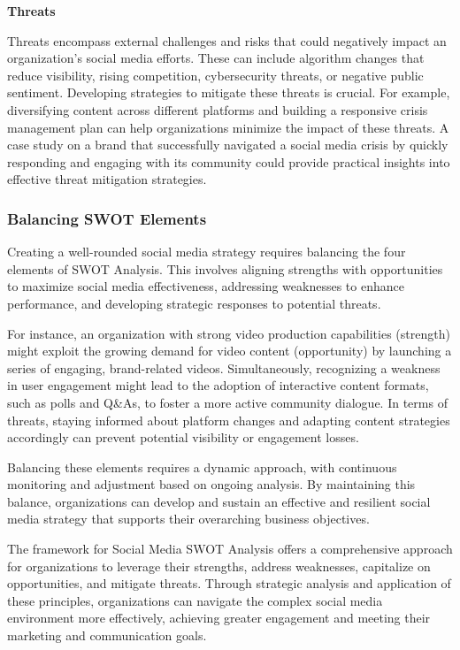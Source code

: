 \documentclass[
]{book}
\begin{document}
\textbf{Threats}

Threats encompass external challenges and risks that could negatively impact an organization's social media efforts. These can include algorithm changes that reduce visibility, rising competition, cybersecurity threats, or negative public sentiment. Developing strategies to mitigate these threats is crucial. For example, diversifying content across different platforms and building a responsive crisis management plan can help organizations minimize the impact of these threats. A case study on a brand that successfully navigated a social media crisis by quickly responding and engaging with its community could provide practical insights into effective threat mitigation strategies.

\hypertarget{balancing-swot-elements}{%
\subsubsection*{Balancing SWOT Elements}\label{balancing-swot-elements}}

Creating a well-rounded social media strategy requires balancing the four elements of SWOT Analysis. This involves aligning strengths with opportunities to maximize social media effectiveness, addressing weaknesses to enhance performance, and developing strategic responses to potential threats.

For instance, an organization with strong video production capabilities (strength) might exploit the growing demand for video content (opportunity) by launching a series of engaging, brand-related videos. Simultaneously, recognizing a weakness in user engagement might lead to the adoption of interactive content formats, such as polls and Q\&As, to foster a more active community dialogue. In terms of threats, staying informed about platform changes and adapting content strategies accordingly can prevent potential visibility or engagement losses.

Balancing these elements requires a dynamic approach, with continuous monitoring and adjustment based on ongoing analysis. By maintaining this balance, organizations can develop and sustain an effective and resilient social media strategy that supports their overarching business objectives.

The framework for Social Media SWOT Analysis offers a comprehensive approach for organizations to leverage their strengths, address weaknesses, capitalize on opportunities, and mitigate threats. Through strategic analysis and application of these principles, organizations can navigate the complex social media environment more effectively, achieving greater engagement and meeting their marketing and communication goals.
\end{document}
